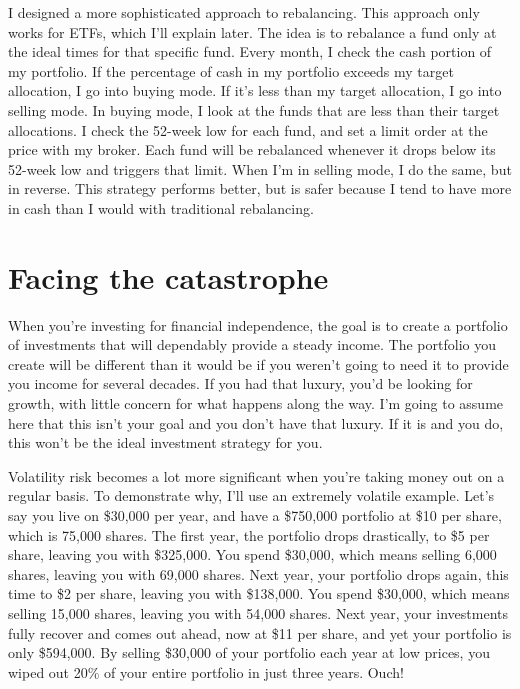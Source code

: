 I designed a more sophisticated approach to rebalancing. This approach only works for ETFs, which I'll explain later. The idea is to rebalance a fund only at the ideal times for that specific fund. Every month, I check the cash portion of my portfolio. If the percentage of cash in my portfolio exceeds my target allocation, I go into buying mode. If it's less than my target allocation, I go into selling mode. In buying mode, I look at the funds that are less than their target allocations. I check the 52-week low for each fund, and set a limit order at the price with my broker. Each fund will be rebalanced whenever it drops below its 52-week low and triggers that limit. When I'm in selling mode, I do the same, but in reverse. This strategy performs better, but is safer because I tend to have more in cash than I would with traditional rebalancing.

\section{Facing the catastrophe}
When you're investing for financial independence, the goal is to create a portfolio of investments that will dependably provide a steady income. The portfolio you create will be different than it would be if you weren't going to need it to provide you income for several decades. If you had that luxury, you'd be looking for growth, with little concern for what happens along the way. I'm going to assume here that this isn't your goal and you don't have that luxury. If it is and you do, this won't be the ideal investment strategy for you.

Volatility risk becomes a lot more significant when you're taking money out on a regular basis. To demonstrate why, I'll use an extremely volatile example. Let's say you live on \$30,000 per year, and have a \$750,000 portfolio at \$10 per share, which is 75,000 shares. The first year, the portfolio drops drastically, to \$5 per share, leaving you with \$325,000. You spend \$30,000, which means selling 6,000 shares, leaving you with 69,000 shares. Next year, your portfolio drops again, this time to \$2 per share, leaving you with \$138,000. You spend \$30,000, which means selling 15,000 shares, leaving you with 54,000 shares. Next year, your investments fully recover and comes out ahead, now at \$11 per share, and yet your portfolio is only \$594,000. By selling \$30,000 of your portfolio each year at low prices, you wiped out 20\% of your entire portfolio in just three years. Ouch!

